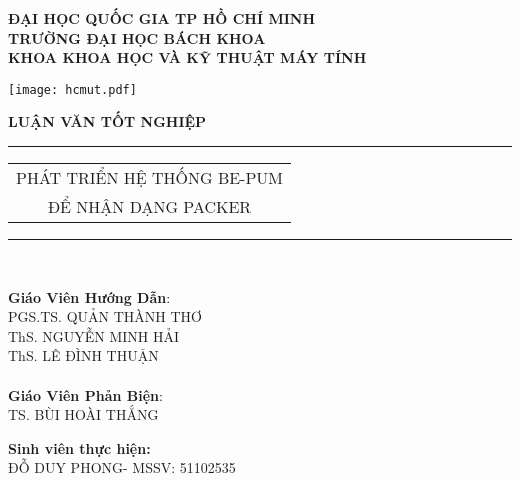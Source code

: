 



\begin{titlepage}


\vspace{-1cm}

\thispagestyle{empty}
\begin{center}
	\bfseries ĐẠI HỌC QUỐC GIA TP HỒ CHÍ MINH \\
	TRƯỜNG ĐẠI HỌC BÁCH KHOA \\
	KHOA KHOA HỌC VÀ KỸ THUẬT MÁY TÍNH\\
\end{center}

\vspace{0.5cm}

\begin{center}
\texttt{[image: hcmut.pdf]}\\[1cm]
\end{center}

\begin{center}
	\Large \bfseries LUẬN VĂN TỐT NGHIỆP \\[0.5cm]
\end{center}
\rule{\textwidth}{1pt}
\begin{center}
\Huge
	\begin{tabular}{@{}c}
		PHÁT TRIỂN HỆ THỐNG BE-PUM \\ 
		ĐỂ NHẬN DẠNG PACKER \\ [6pt]
	\end{tabular}
\end{center}
\rule{\textwidth}{1pt}\\[1cm]

\hspace{-0.5cm}
\begin{minipage}[t]{0.44\linewidth}
	\textbf{Giáo Viên Hướng Dẫn}: \\
		PGS.TS. QUẢN THÀNH THƠ\\
		ThS. NGUYỄN MINH HẢI\\
		ThS. LÊ ĐÌNH THUẬN\\\\
	\textbf{Giáo Viên Phản Biện}: \\
		 TS. BÙI HOÀI THẮNG
	\end{minipage}
\begin{minipage}[t]{0.60\linewidth}
	\textbf{Sinh viên thực hiện:}\\
		ĐỖ DUY PHONG- MSSV: 51102535
\end{minipage}


\end{titlepage}
